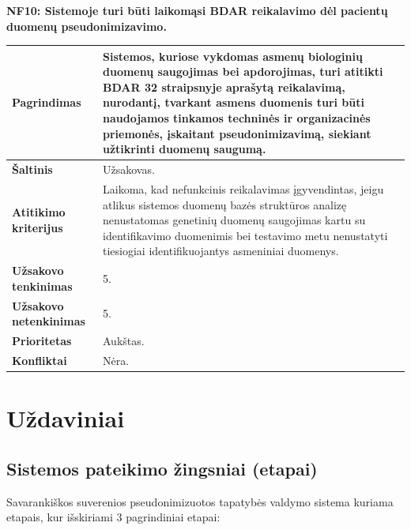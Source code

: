 \documentclass[12pt]{article}
\begin{document}
\noindent \textbf{NF10: Sistemoje turi būti laikomąsi BDAR reikalavimo dėl
pacientų duomenų pseudonimizavimo.}
\label{sec:NF10}
\begin{table}[htb!]
    \captionsetup{justification=centering}
    \vskip -10pt
    \begin{tabular}{|m{4.9cm}|m{11cm}|}
        \hline
        \raggedleft \textbf{\cellcolor{deepchampagne}Pagrindimas} &
        Sistemos, kuriose vykdomas asmenų biologinių duomenų saugojimas bei
        apdorojimas, turi atitikti BDAR 32 straipsnyje aprašytą reikalavimą,
        nurodantį, tvarkant asmens duomenis turi būti naudojamos tinkamos
        techninės ir organizacinės priemonės, įskaitant pseudonimizavimą,
        siekiant užtikrinti duomenų saugumą. \\
        \hline
        \raggedleft \textbf{\cellcolor{deepchampagne}Šaltinis} & Užsakovas. \\
        \hline
        \raggedleft \textbf{\cellcolor{deepchampagne}Atitikimo kriterijus} & 
        Laikoma, kad nefunkcinis reikalavimas įgyvendintas, jeigu atlikus
        sistemos duomenų bazės struktūros analizę nenustatomas genetinių duomenų
        saugojimas kartu su identifikavimo duomenimis bei testavimo metu
        nenustatyti tiesiogiai identifikuojantys asmeniniai duomenys. \\
        \hline
        \raggedleft \textbf{\cellcolor{deepchampagne}Užsakovo tenkinimas} & 5. \\
        \hline
        \raggedleft \textbf{\cellcolor{deepchampagne}Užsakovo netenkinimas} & 5. \\
        \hline
        \raggedleft \textbf{\cellcolor{deepchampagne}Prioritetas} & Aukštas. \\
        \hline
        \raggedleft \textbf{\cellcolor{deepchampagne}Konfliktai} & Nėra. \\
        \hline
    \end{tabular}
\end{table}

\newpage

\newpage

\section{Uždaviniai}
\subsection{Sistemos pateikimo žingsniai (etapai)}
Savarankiškos suverenios pseudonimizuotos tapatybės valdymo sistema kuriama
etapais, kur išskiriami 3 pagrindiniai etapai:
\end{document}
